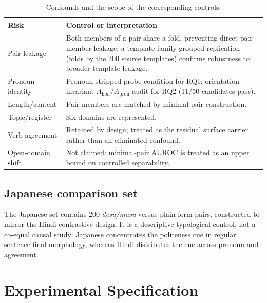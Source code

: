 \documentclass[10pt]{article}
\begin{document}
\begin{table}[H]
\centering
\small
\begin{tabularx}{\columnwidth}{p{2.1cm}X}
\toprule
\textbf{Risk} & \textbf{Control or interpretation} \\
\midrule
Pair leakage & Both members of a pair share a fold, preventing direct pair-member leakage; a template-family-grouped replication (folds by the 200 source templates) confirms robustness to broader template leakage. \\
Pronoun identity & Pronoun-stripped probe condition for RQ1; orientation-invariant $A_{\mathrm{hon}}$/$A_{\mathrm{pron}}$ audit for RQ2 (11/50 candidates pass). \\
Length/content & Pair members are matched by minimal-pair construction. \\
Topic/register & Six domains are represented. \\
Verb agreement & Retained by design; treated as the residual surface carrier rather than an eliminated confound. \\
Open-domain shift & Not claimed: minimal-pair AUROC is treated as an upper bound on controlled separability. \\
\bottomrule
\end{tabularx}
\caption{Confounds and the scope of the corresponding controls.}
\label{tab:confounds}
\end{table}

\subsection{Japanese comparison set}

The Japanese set contains 200 \textit{desu/masu} versus plain-form pairs,
constructed to mirror the Hindi contrastive design. It is a descriptive
typological control, not a co-equal causal study: Japanese concentrates the
politeness cue in regular sentence-final morphology, whereas Hindi distributes
the cue across pronoun and agreement.
\FloatBarrier

\section{Experimental Specification}
\end{document}
